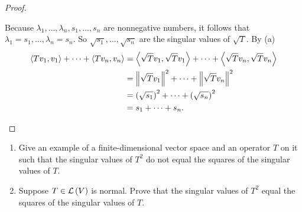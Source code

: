 \begin{proof}
\begin{enumerate}[label={(\alph*)}]
              Because $\lambda_{1}, \ldots, \lambda_{n}, s_{1}, \ldots, s_{n}$ are nonnegative numbers, it follows that $\lambda_{1} = s_{1}, \ldots, \lambda_{n} = s_{n}$. So $\sqrt{s_{1}}, \ldots, \sqrt{s_{n}}$ are the singular values of $\sqrt{T}$. By (a)
              \begin{align*}
                  \left\langle{Tv_{1}, v_{1}}\right\rangle + \cdots + \left\langle{Tv_{n}, v_{n}}\right\rangle & = \left\langle{\sqrt{T}v_{1}, \sqrt{T}v_{1}}\right\rangle + \cdots + \left\langle{\sqrt{T}v_{n}, \sqrt{T}v_{n}}\right\rangle \\
                                                                                 & = \left\Vert{\sqrt{T}v_{1}}\right\Vert^{2} + \cdots + \left\Vert{\sqrt{T}v_{n}}\right\Vert^{2}                                 \\
                                                                                 & = {(\sqrt{s_{1}})}^{2} + \cdots + {(\sqrt{s_{n}})}^{2}                                         \\
                                                                                 & = s_{1} + \cdots + s_{n}.
              \end{align*}
    \end{enumerate}
\end{proof}
\newpage

\begin{exercise}
    \begin{enumerate}[label={(\alph*)}]
        \item Give an example of a finite-dimensional vector space and an operator $T$ on it such that the singular values of $T^{2}$ do not equal the squares of the singular values of $T$.
        \item Suppose $T\in\mathcal{L}\left({V}\right)$ is normal. Prove that the singular values of $T^{2}$ equal the squares of the singular values of $T$.
    \end{enumerate}
\end{exercise}

